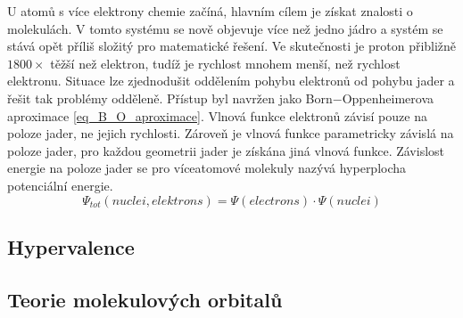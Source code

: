 \documentclass[
  digital, %
  table,   %
  lof,     %
  lot,     %
]{fithesis3}
\begin{document}
U atomů s více  elektrony chemie začíná, hlavním cílem je získat znalosti o molekulách. V tomto systému se nově objevuje více než jedno jádro a systém se stává opět příliš složitý pro matematické řešení. Ve skutečnosti je proton přibližně $1800 \times$ těžší než elektron, tudíž je rychlost mnohem menší, než rychlost elektronu. Situace lze zjednodušit oddělením pohybu elektronů od pohybu jader a řešit tak problémy odděleně. Přístup byl navržen jako Born$-$Oppenheimerova aproximace \ref{eq_B_O_aproximace}. Vlnová funkce elektronů závisí pouze na poloze jader, ne jejich rychlosti.\cite{lechamolecularmodeling} Zároveň je vlnová funkce parametricky závislá na poloze jader, pro každou geometrii jader je získána jiná vlnová funkce. Závislost energie na poloze jader se pro víceatomové molekuly nazývá hyperplocha potenciální energie. \cite{dftshrnutivysledky}
\begin{equation}
\Psi_{tot}(nuclei, elektrons) = \Psi(electrons) \cdot \Psi(nuclei)
\label{eq_B_O_aproximace} 
\end{equation}

\subsection{Hypervalence}
\subsection{Teorie molekulových orbitalů}
\end{document}
